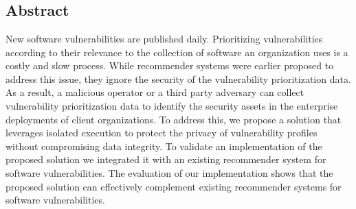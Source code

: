 \chapter[\paperVtitle]{\texorpdfstring{%
		\paperVtitle}{%
		\paperVtitle}}
\label{ch:recsyssgx}
\paperRemark{\paperVref} %

{




%

%



\section*{Abstract}
New software vulnerabilities are published daily.
Prioritizing vulnerabilities according to their relevance to the collection of software an organization uses is a costly and slow process.
While recommender systems were earlier proposed to address this issue, they ignore the security of the vulnerability prioritization data.
As a result, a malicious operator or a third party adversary can collect vulnerability prioritization data to identify the security assets in the enterprise deployments of client organizations. 
To address this, we propose a solution that leverages isolated execution to protect the privacy of vulnerability profiles without compromising data integrity.
To  validate an implementation of the proposed solution we integrated it with an existing recommender system for software vulnerabilities.
The evaluation of our implementation shows that the proposed solution can effectively complement existing recommender systems for software vulnerabilities. 

}
